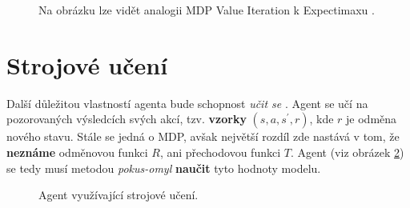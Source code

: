 \begin{figure}[ht]
\begin{center}
  \caption{Na obrázku lze vidět analogii MDP Value Iteration k Expectimaxu \cite{RLIntro}.}
  \label{img:mdptree}
\end{center}
\end{figure}
\newpage
\section{Strojové učení}
\label{sec:rl}
Další důležitou vlastností agenta bude schopnost \textit{učit se} \cite{RLIntro}. Agent se učí na pozorovaných výsledcích svých akcí, tzv. \textbf{vzorky} $(s,a,s^\prime,r)$, kde $r$ je odměna nového stavu. Stále se jedná o MDP, avšak největší rozdíl zde nastává v tom, že \textbf{neznáme} odměnovou funkci $R$, ani přechodovou funkci $T$. Agent (viz obrázek \ref{img:learningagent}) se tedy musí metodou \textit{pokus-omyl} \textbf{naučit} tyto hodnoty modelu.

\begin{figure}[!htbp]
\begin{center}
  \caption{Agent využívající strojové učení.}
  \label{img:learningagent}
\end{center}
\end{figure}

